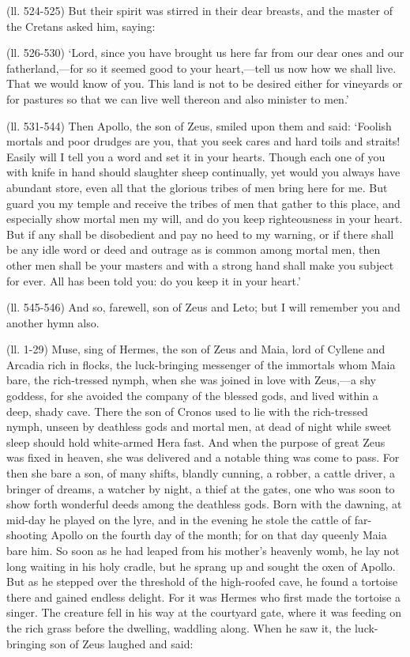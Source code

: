 (ll. 524-525) But their spirit was stirred in their dear breasts, and the
master of the Cretans asked him, saying:

(ll. 526-530) ‘Lord, since you have brought us here far from our dear
ones and our fatherland,—for so it seemed good to your heart,—tell
us now how we shall live. That we would know of you. This land is not to be
desired either for vineyards or for pastures so that we can live well thereon
and also minister to men.’

(ll. 531-544) Then Apollo, the son of Zeus, smiled upon them and said:
‘Foolish mortals and poor drudges are you, that you seek cares and hard
toils and straits! Easily will I tell you a word and set it in your hearts.
Though each one of you with knife in hand should slaughter sheep continually,
yet would you always have abundant store, even all that the glorious tribes of
men bring here for me. But guard you my temple and receive the tribes of men
that gather to this place, and especially show mortal men my will, and do you
keep righteousness in your heart. But if any shall be disobedient and pay no
heed to my warning, or if there shall be any idle word or deed and outrage as
is common among mortal men, then other men shall be your masters and with a
strong hand shall make you subject for ever. All has been told you: do you keep
it in your heart.’

(ll. 545-546) And so, farewell, son of Zeus and Leto; but I will remember you
and another hymn also.


(ll. 1-29) Muse, sing of Hermes, the son of Zeus and Maia, lord of Cyllene and
Arcadia rich in flocks, the luck-bringing messenger of the immortals whom Maia
bare, the rich-tressed nymph, when she was joined in love with Zeus,—a
shy goddess, for she avoided the company of the blessed gods, and lived within
a deep, shady cave. There the son of Cronos used to lie with the rich-tressed
nymph, unseen by deathless gods and mortal men, at dead of night while sweet
sleep should hold white-armed Hera fast. And when the purpose of great Zeus was
fixed in heaven, she was delivered and a notable thing was come to pass. For
then she bare a son, of many shifts, blandly cunning, a robber, a cattle
driver, a bringer of dreams, a watcher by night, a thief at the gates, one who
was soon to show forth wonderful deeds among the deathless gods. Born with the
dawning, at mid-day he played on the lyre, and in the evening he stole the
cattle of far-shooting Apollo on the fourth day of the month; for on that day
queenly Maia bare him. So soon as he had leaped from his mother’s
heavenly womb, he lay not long waiting in his holy cradle, but he sprang up and
sought the oxen of Apollo. But as he stepped over the threshold of the
high-roofed cave, he found a tortoise there and gained endless delight. For it
was Hermes who first made the tortoise a singer. The creature fell in his way
at the courtyard gate, where it was feeding on the rich grass before the
dwelling, waddling along. When he saw it, the luck-bringing son of Zeus laughed
and said:

